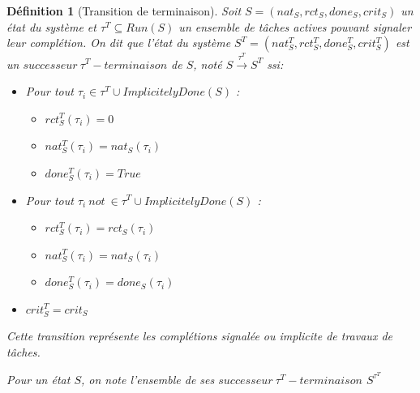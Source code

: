 \documentclass[11pt,a4paper,oneside]{book}
\theoremstyle{break}
\newtheorem{defin}{Définition}
\theoremstyle{breakplain}
\begin{document}
\begin{defin}[Transition de terminaison]
\label{tterm}
Soit $S = (nat_S, rct_S, done_S, crit_S)$ un état du système et $\tau^T \subseteq Run(S)$ un ensemble de tâches actives pouvant signaler leur complétion. On dit que l'état du système $S^T = (nat_S^T, rct_S^T, done_S^T, crit_S^T)$ est un $successeur\ \tau^T-terminaison$ de $S$, noté $S\xrightarrow{\tau^T}S^T$ ssi:
\begin{itemize}
\item Pour tout $\tau_i \in \tau^T \cup ImplicitelyDone(S)$ :\begin{itemize}
\item $rct_{S}^T(\tau_i) = 0$
\item $nat_{S}^T(\tau_i) = nat_{S}(\tau_i)$
\item $done_{S}^T(\tau_i) = True$
\end{itemize}

\item Pour tout $\tau_i\ not\ \in \tau^T \cup ImplicitelyDone(S)$ :\begin{itemize}
\item $rct_{S}^T(\tau_i) = rct_{S}(\tau_i)$
\item $nat_{S}^T(\tau_i) = nat_{S}(\tau_i)$
\item $done_{S}^T(\tau_i) = done_{S}(\tau_i)$
\end{itemize}
\item $crit_{S}^T = crit_{S}$

\end{itemize}
Cette transition représente les complétions signalée ou implicite de travaux de tâches.

Pour un état $S$, on note l'ensemble de ses $successeur\ \tau^T-terminaison$ $S^{\tau^T}$
\end{defin}
\end{document}
